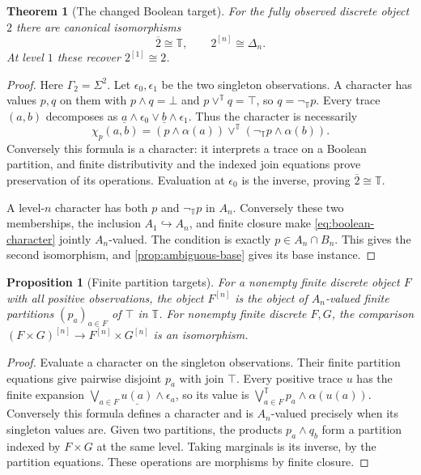 \documentclass[11pt,a4paper]{article}
\numberwithin{equation}{section}
\newtheorem{theorem}{Theorem}[section]
\newtheorem{proposition}[proposition]{Proposition}
\theoremstyle{definition}
\theoremstyle{remark}
\theoremstyle{plain}
\newcommand{\TV}{\mathbb T}
\newcommand{\incl}{\hookrightarrow}
\newcommand{\negT}{\neg_{\TV}}
\begin{document}
\begin{theorem}[The changed Boolean target]
\label{thm:boolean-spectrum}
For the fully observed discrete object $2$ there are canonical
isomorphisms
\[
 \overline2\cong\TV,\qquad 2^{[n]}\cong\Delta_n.
\]
At level $1$ these recover $2^{[1]}\cong2$.
\end{theorem}
\begin{proof}
Here $\Gamma_2=\Sigma^2$. Let $\epsilon_0,\epsilon_1$ be the two
singleton observations. A character has values $p,q$ on them with
$p\wedge q=\bot$ and $p\vee^{\TV}q=\top$, so $q=\negT p$.
Every trace $(a,b)$ decomposes as
$\underline a\wedge\epsilon_0\vee\underline b\wedge\epsilon_1$.
Thus the character is necessarily
\begin{equation}\label{eq:boolean-character}
 \chi_p(a,b)=(p\wedge\alpha(a))\vee^{\TV}
                 (\negT p\wedge\alpha(b)).
\end{equation}
Conversely this formula is a character: it interprets a trace on a
Boolean partition, and finite distributivity and the indexed join
equations prove preservation of its operations. Evaluation at
$\epsilon_0$ is the inverse, proving $\overline2\cong\TV$.

A level-$n$ character has both $p$ and $\negT p$ in $A_n$.
Conversely these two memberships, the inclusion $A_1\incl A_n$,
and finite closure make \eqref{eq:boolean-character} jointly
$A_n$-valued. The condition is exactly $p\in A_n\cap B_n$.
This gives the second isomorphism, and \cref{prop:ambiguous-base}
gives its base instance.
\end{proof}

\begin{proposition}[Finite partition targets]
\label{prop:finite-target-products}
For a nonempty finite discrete object $F$ with all positive observations,
the object $F^{[n]}$ is the object of $A_n$-valued finite partitions
$(p_a)_{a\in F}$ of $\top$ in $\TV$. For nonempty finite discrete
$F,G$, the comparison
$(F\times G)^{[n]}\to F^{[n]}\times G^{[n]}$ is an isomorphism.
\end{proposition}
\begin{proof}
Evaluate a character on the singleton observations. Their finite
partition equations give pairwise disjoint $p_a$ with join $\top$.
Every positive trace $u$ has the finite expansion
$\bigvee_{a\in F}\underline{u(a)}\wedge\epsilon_a$, so its value is
$\bigvee_{a\in F}^{\TV}p_a\wedge\alpha(u(a))$. Conversely this
formula defines a character and is $A_n$-valued precisely when its
singleton values are. Given two partitions, the products $p_a\wedge q_b$
form a partition indexed by $F\times G$ at the same level. Taking
marginals is its inverse, by the partition equations. These operations
are morphisms by finite closure.
\end{proof}
\end{document}
